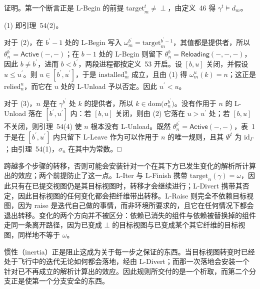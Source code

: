 证明。第一个断言正是 L-Begin 的前提 \(\mathrm { t a r g e t } _ { m } ^ { t } \neq \perp\)，由定义~46 得 \(\gamma ^ { t } \models d _ { m }\)。

(1) 即引理~54(2)。

对于 (2)，在 \(b ^ { \prime } - 1\) 处的 L-Begin 写入 \(\omega _ { m } ^ { b ^ { \prime } } = \mathrm { t a r g e t } _ { m } ^ { b ^ { \prime } - 1 }\)，其值都是提供者，所以 \(\theta _ { n } ^ { b ^ { \prime } } = \mathsf { A c t i v e } ( - , - )\)；在 \(b - 1\) 处的 L-Begin 则留下 \(\theta _ { n } ^ { b } = \mathsf { R e l o a d i n g } ( - , - , - )\)，因此 \(b \neq b ^ { \prime }\)，进而 \(b < b ^ { \prime }\)，两段进程都按定义~53 开启。设 \([ b , u ]\) 关闭，并假设 \(u \leq u ^ { \prime }\)。则 \(u \in [ b ^ { \prime } , u ^ { \prime } ]\)，于是 \(\mathrm { i n s t a l l e d } _ { m } ^ { u }\) 成立，且由 (1) 得 \(\omega _ { m } ^ { u } ( k ) = n\)；这正是 \(\mathrm { r e l i e d } _ { n } ^ { u }\)，而它在 \(u\) 处的 L-Unload 予以否定。因此 \(u ^ { \prime } < u\)。

对于 (3)，\(n\) 是在 \(\gamma ^ { b ^ { \prime } }\) 处 \(k\) 的提供者，所以 \(k \in \mathrm { d o m } \bigl ( \sigma _ { n } ^ { b ^ { \prime } } \bigr )\)。没有作用于 \(n\) 的 L-Unload 落在 \([ b ^ { \prime } , u ^ { \prime } ]\) 内：若 \([ b , u ]\) 关闭，则由 (2) 它落在 \(u > u ^ { \prime }\) 处；若 \([ b , u ]\) 不关闭，则引理~54(4) 使 \(n\) 根本没有 L-Unload。既然 \(\theta _ { n } ^ { b ^ { \prime } } = \mathsf { A c t i v e } ( - , - )\)，表~1 于是在 \([ b ^ { \prime } , u ^ { \prime } ]\) 内只留下 L-Leave 作为可以作用于 \(n\) 的唯一规则，且其 \(\Psi ^ { t }\) 为 \(\mathrm { i d } _ { \Gamma }\)；由引理~54(1)，\(\sigma _ { n }\) 在其中为常数。□

跨越多个步骤的转移，否则可能会安装针对一个在其下方已发生变化的解析所计算出的效应；两个前提防止了这一点。L-Iter 与 L-Finish 携带 \(\mathrm { t a r g e t } _ { n } ( \gamma ) = \omega\)，因此只有在已提交视图仍是其目标视图时，转移才会继续进行；L-Divert 携带其否定，因此目标视图的任何变化都会把纤维带出转移。L-Raise 则完全不依赖目标视图，因为 raise 是迭代自己做的事情，而非环境所要求的，且它在任何情况下都会退出转移。变化的两个方向并不被区分：依赖已消失的组件与依赖被替换掉的组件走同一条离开路径，因为已变成 \(\bot\) 的目标视图与已变成某个其它纤维的目标视图，同样地不等于 \(\omega\)。

惯性（inertia）正是阻止这成为关于每一步之保证的东西。当目标视图转变时已经处于飞行中的迭代无论如何都会落地，经由 L-Divert；而那一次落地会安装一个针对已不再成立的解析计算出的效应。因此规则所交付的是一个析取，而第二个分支正是使第一个分支安全的东西。

